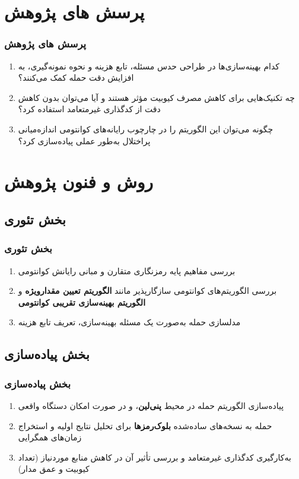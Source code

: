 \documentclass[xcolor=dvipsnames, professionalfonts, aspectratio=169, 11pt]{beamer}
\begin{document}
\section{پرسش های پژوهش}
\begin{frame}
    \frametitle{پرسش های پژوهش}
    \begin{enumerate}
        \item کدام بهینه‌سازی‌ها در طراحی حدس مسئله، تابع هزینه و نحوه نمونه‌گیری، به افزایش دقت حمله کمک می‌کنند؟
        \item چه تکنیک‌هایی برای کاهش مصرف کیوبیت مؤثر هستند و آیا می‌توان بدون کاهش دقت از کدگذاری غیرمتعامد استفاده کرد؟
        \item چگونه می‌توان این الگوریتم را در چارچوب رایانه‌های کوانتومی اندازه‌میانی پراختلال به‌طور عملی پیاده‌سازی کرد؟
    \end{enumerate}
\end{frame}

\section{روش و فنون پژوهش}
\subsection{بخش تئوری}
\begin{frame}
    \frametitle{بخش تئوری}
    \begin{enumerate}
        \item بررسی مفاهیم پایه رمزنگاری متقارن و مبانی رایانش کوانتومی
        \item بررسی الگوریتم‌های کوانتومی سازگارپذیر مانند \textbf{الگوریتم تعیین مقدارویژه} و \textbf{الگوریتم بهینه‌سازی تقریبی کوانتومی}
        \item مدلسازی حمله به‌صورت یک مسئله بهینه‌سازی، تعریف تابع هزینه
    \end{enumerate}
\end{frame}
\subsection{بخش پیاده‌سازی}
\begin{frame}
    \frametitle{بخش پیاده‌سازی}
    \begin{enumerate}
        \item پیاده‌سازی الگوریتم حمله در محیط \textbf{پنی‌لین}، و در صورت امکان دستگاه واقعی
        \item حمله به نسخه‌های ساده‌شده \textbf{بلوک‌رمزها} برای تحلیل نتایج اولیه و استخراج زمان‌های همگرایی
        \item به‌کارگیری کدگذاری غیرمتعامد و بررسی تأثیر آن در کاهش منابع موردنیاز (تعداد کیوبیت و عمق مدار)
    \end{enumerate}
\end{frame}
\end{document}

